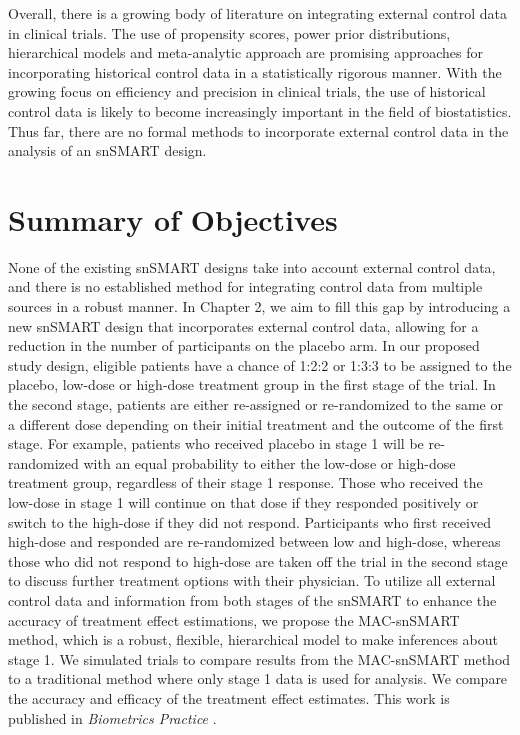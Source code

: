 Overall, there is a growing body of literature on integrating external control data in clinical trials. The use of propensity scores, power prior distributions, hierarchical models and meta-analytic approach are promising approaches for incorporating historical control data in a statistically rigorous manner. With the growing focus on efficiency and precision in clinical trials, the use of historical control data is likely to become increasingly important in the field of biostatistics. Thus far, there are no formal methods to incorporate external control data in the analysis of an \ac{snSMART} design.

\section{Summary of Objectives}
None of the existing \ac{snSMART} designs take into account external control data, and there is no established method for integrating control data from multiple sources in a robust manner. In Chapter 2, we aim to fill this gap by introducing a new \ac{snSMART} design that incorporates external control data, allowing for a reduction in the number of participants on the placebo arm. In our proposed study design, eligible patients have a chance of 1:2:2 or 1:3:3 to be assigned to the placebo, low-dose or high-dose treatment group in the first stage of the trial. In the second stage, patients are either re-assigned or re-randomized to the same or a different dose depending on their initial treatment and the outcome of the first stage. For example, patients who received placebo in stage 1 will be re-randomized with an equal probability to either the low-dose or high-dose treatment group, regardless of their stage 1 response. Those who received the low-dose in stage 1 will continue on that dose if they responded positively or switch to the high-dose if they did not respond. Participants who first received high-dose and responded are re-randomized between low and high-dose, whereas those who did not respond to high-dose are taken off the trial in the second stage to discuss further treatment options with their physician. To utilize all external control data and information from both stages of the \ac{snSMART} to enhance the accuracy of treatment effect estimations, we propose the MAC-snSMART method, which is a robust, flexible, hierarchical model to make inferences about stage 1. We simulated trials to compare results from the MAC-snSMART method to a traditional method where only stage 1 data is used for analysis. We compare the accuracy and efficacy of the treatment effect estimates. This work is published in \textit{Biometrics Practice} \citep{wang2023dynamic}.

